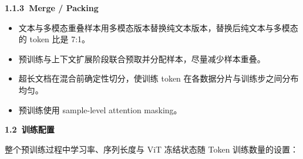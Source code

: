 \documentclass[zihao=false,fontset=windows]{ctexart}
\begin{document}
\par{}\vspace{0.8em}\noindent \begin{tcolorbox}[boxrule=0pt,arc=3pt,colback=callGreen,left=3pt,right=3pt,top=2pt,bottom=2pt,before skip=0pt,after skip=0pt]{\bfseries \textcolor{feishuBlue}{1.1.3}\ Merge / Packing}\end{tcolorbox}\par\vspace{0.28em}
\begin{itemize}
\item 
文本与多模态重叠样本用多模态版本替换纯文本版本，替换后纯文本与多模态的 token 比是 7:1。\par
\item 
预训练与上下文扩展阶段联合预取并分配样本，尽量减少样本重叠。\par
\item 
超长文档在混合前确定性切分，使训练 token 在各数据分片与训练步之间分布均匀。\par
\item 
预训练使用 sample-level attention masking。\par
\end{itemize}

\par{}\vspace{0.8em}\noindent \begin{tcolorbox}[boxrule=0pt,arc=3pt,colback=callOrange,left=3pt,right=3pt,top=2pt,bottom=2pt,before skip=0pt,after skip=0pt]{\bfseries \textcolor{feishuBlue}{1.2}\ 训练配置}\end{tcolorbox}\par\vspace{0.28em}

整个预训练过程中学习率、序列长度与 ViT 冻结状态随 Token 训练数量的设置：\par
\end{document}
